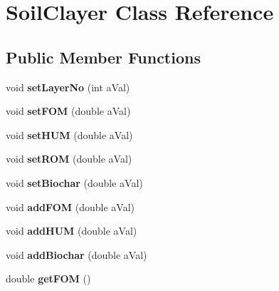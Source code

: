 \hypertarget{class_soil_clayer}{}\section{Soil\+Clayer Class Reference}
\label{class_soil_clayer}
\subsection*{Public Member Functions}
\begin{DoxyCompactItemize}
\item 
\mbox{\label{class_soil_clayer_ad32a0095b99de4d49a69f8e1a67c680f}} 
void {\bfseries set\+Layer\+No} (int a\+Val)
\item 
\mbox{\label{class_soil_clayer_a38b401bddeea29a506d613685d3fd9e7}} 
void {\bfseries set\+F\+OM} (double a\+Val)
\item 
\mbox{\label{class_soil_clayer_a8bc3b2e41a50a85f8c4b98293acff103}} 
void {\bfseries set\+H\+UM} (double a\+Val)
\item 
\mbox{\label{class_soil_clayer_a7688815873c1b9759a1701539b905883}} 
void {\bfseries set\+R\+OM} (double a\+Val)
\item 
\mbox{\label{class_soil_clayer_aee7a8dc76945ac6f4797517bfe51c10e}} 
void {\bfseries set\+Biochar} (double a\+Val)
\item 
\mbox{\label{class_soil_clayer_a9d4734c2cc8736bb04b2f7d163900eac}} 
void {\bfseries add\+F\+OM} (double a\+Val)
\item 
\mbox{\label{class_soil_clayer_a221ec3644b0aef328a8615c26f99bfca}} 
void {\bfseries add\+H\+UM} (double a\+Val)
\item 
\mbox{\label{class_soil_clayer_ad4ff61d6fc320884f78f259399baa800}} 
void {\bfseries add\+Biochar} (double a\+Val)
\item 
\mbox{\label{class_soil_clayer_a871b01c2ee3de2487ea0d08f995b52e6}} 
double {\bfseries get\+F\+OM} ()
\item 

\end{DoxyCompactItemize}
